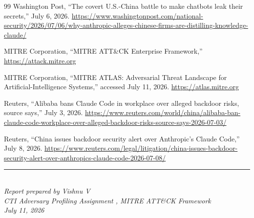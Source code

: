 \documentclass[11pt,a4paper]{article}
\begin{document}
\begin{thebibliography}{99}
 Washington Post, ``The covert U.S.-China battle to make chatbots leak their secrets,'' July 6, 2026. \url{https://www.washingtonpost.com/national-security/2026/07/06/why-anthropic-alleges-chinese-firms-are-distilling-knowledge-claude/}

 MITRE Corporation, ``MITRE ATT\&CK Enterprise Framework,'' \url{https://attack.mitre.org}

 MITRE Corporation, ``MITRE ATLAS: Adversarial Threat Landscape for Artificial-Intelligence Systems,'' accessed July 11, 2026. \url{https://atlas.mitre.org}

 Reuters, ``Alibaba bans Claude Code in workplace over alleged backdoor risks, source says,'' July 3, 2026. \url{https://www.reuters.com/world/china/alibaba-ban-claude-code-workplace-over-alleged-backdoor-risks-source-says-2026-07-03/}

 Reuters, ``China issues backdoor security alert over Anthropic's Claude Code,'' July 8, 2026. \url{https://www.reuters.com/legal/litigation/china-issues-backdoor-security-alert-over-anthropics-claude-code-2026-07-08/}

\end{thebibliography}

\vfill
\begin{center}
\rule{0.4\textwidth}{0.6pt}\\[6pt]
\small\textit{Report prepared by Vishnu V}\\
\small\textit{CTI Adversary Profiling Assignment ,  MITRE ATT\&CK Framework}\\
\small\textit{July 11, 2026}
\end{center}
\end{document}
